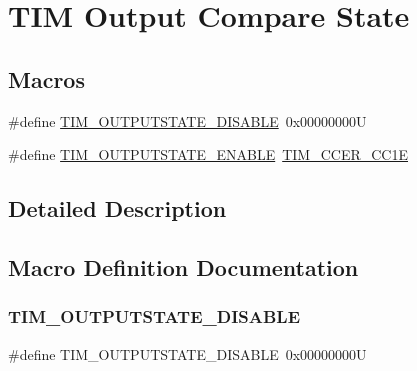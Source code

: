 \hypertarget{group___t_i_m___output___compare___state}{}\section{T\+IM Output Compare State}
\label{group___t_i_m___output___compare___state}
\subsection*{Macros}
\begin{DoxyCompactItemize}
\item 
\#define \hyperlink{group___t_i_m___output___compare___state_ga98fa585adffeb0d3654b47040576c6b7}{T\+I\+M\+\_\+\+O\+U\+T\+P\+U\+T\+S\+T\+A\+T\+E\+\_\+\+D\+I\+S\+A\+B\+LE}~0x00000000U
\item 
\#define \hyperlink{group___t_i_m___output___compare___state_ga114555abc521311f689478a7e0a9ace9}{T\+I\+M\+\_\+\+O\+U\+T\+P\+U\+T\+S\+T\+A\+T\+E\+\_\+\+E\+N\+A\+B\+LE}~\hyperlink{group___peripheral___registers___bits___definition_ga3f494b9881e7b97bb2d79f7ad4e79937}{T\+I\+M\+\_\+\+C\+C\+E\+R\+\_\+\+C\+C1E}
\end{DoxyCompactItemize}


\subsection{Detailed Description}


\subsection{Macro Definition Documentation}
\mbox{\label{group___t_i_m___output___compare___state_ga98fa585adffeb0d3654b47040576c6b7}} 
\subsubsection{\texorpdfstring{T\+I\+M\+\_\+\+O\+U\+T\+P\+U\+T\+S\+T\+A\+T\+E\+\_\+\+D\+I\+S\+A\+B\+LE}{TIM\_OUTPUTSTATE\_DISABLE}}
{\footnotesize\ttfamily \#define T\+I\+M\+\_\+\+O\+U\+T\+P\+U\+T\+S\+T\+A\+T\+E\+\_\+\+D\+I\+S\+A\+B\+LE~0x00000000U}

